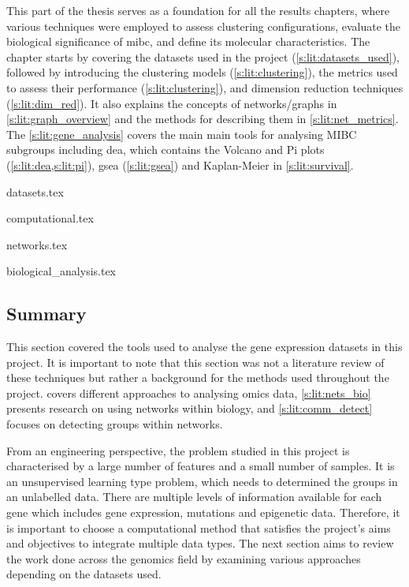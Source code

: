 This part of the thesis serves as a foundation for all the results chapters, where various techniques were employed to assess clustering configurations, evaluate the biological significance of \acrshort{mibc}, and define its molecular characteristics. The chapter starts by covering the datasets used in the project (\cref{s:lit:datasets_used}), followed by introducing the clustering models (\cref{s:lit:clustering}), the metrics used to assess their performance (\cref{s:lit:clustering}), and dimension reduction techniques (\cref{s:lit:dim_red}). It also explains the concepts of networks/graphs in \cref{s:lit:graph_overview} and the methods for describing them in \cref{s:lit:net_metrics}. The \cref{s:lit:gene_analysis} covers the main main tools for analysing MIBC subgroups including \acrfull{dea}, which contains the Volcano and Pi plots (\cref{s:lit:dea,s:lit:pi}), \acrfull{gsea} (\cref{s:lit:gsea}) and Kaplan-Meier in \cref{s:lit:survival}.



{datasets.tex}

{computational.tex}

{networks.tex}

{biological_analysis.tex}



\subsection{Summary} \label{s:lit:choosing_ml}


This section covered the tools used to analyse the gene expression datasets in this project. It is important to note that this section was not a literature review of these techniques but rather a background for the methods used throughout the project.  covers different approaches to analysing omics data, \cref{s:lit:nets_bio} presents research on using networks within biology, and \cref{s:lit:comm_detect} focuses on detecting groups within networks.

From an engineering perspective, the problem studied in this project is characterised by a large number of features and a small number of samples. It is an unsupervised learning type problem, which needs to determined the groups in an unlabelled data. There are multiple levels of information available for each gene which includes gene expression, mutations and epigenetic data. Therefore, it is important to choose a computational method that satisfies the project's aims and objectives to integrate multiple data types. The next section aims to review the work done across the genomics field by examining various approaches depending on the datasets used.
